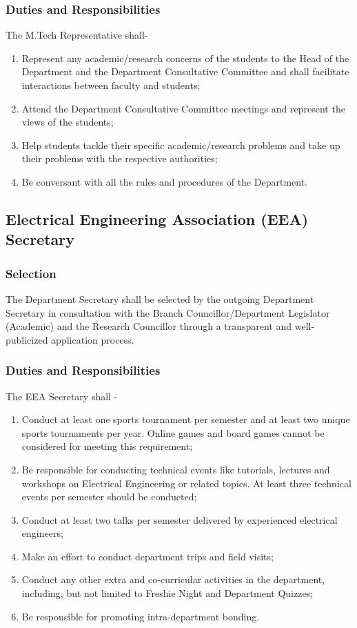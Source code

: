 \documentclass[12pt]{charter}
\begin{document}
\subsubsection{Duties and Responsibilities}
The M.Tech Representative shall-
\begin{enumerate}
	\item Represent any academic/research concerns of the students to the Head of the Department and the Department Consultative Committee and shall facilitate interactions between faculty and students;
	\item Attend the Department Consultative Committee meetings and represent the views of the students;
	\item Help students tackle their specific academic/research problems and take up their problems with the respective authorities;
	\item Be conversant with all the rules and procedures of the Department.
	
\end{enumerate}

\subsection{Electrical Engineering Association (EEA) Secretary}
\subsubsection{Selection}
The Department Secretary shall be selected by the outgoing Department Secretary in consultation with the Branch Councillor/Department Legislator (Academic) and the Research Councillor through a transparent and well-publicized application process.

\subsubsection{Duties and Responsibilities}
The EEA Secretary shall -
\begin{enumerate}
	\item Conduct at least one sports tournament per semester and at least two unique sports tournaments per year. Online games and board games cannot be considered for meeting this requirement;
	\item Be responsible for conducting technical events like tutorials, lectures and workshops on Electrical Engineering or related topics. At least three technical events per semester should be conducted;
	\item Conduct at least two talks per semester delivered by experienced electrical engineers;
	\item Make an effort to conduct department trips and field visits;
	\item Conduct any other extra and co-curricular activities in the department, including, but not limited to Freshie Night and Department Quizzes;
	\item Be responsible for promoting intra-department bonding.
	
\end{enumerate}
\end{document}
